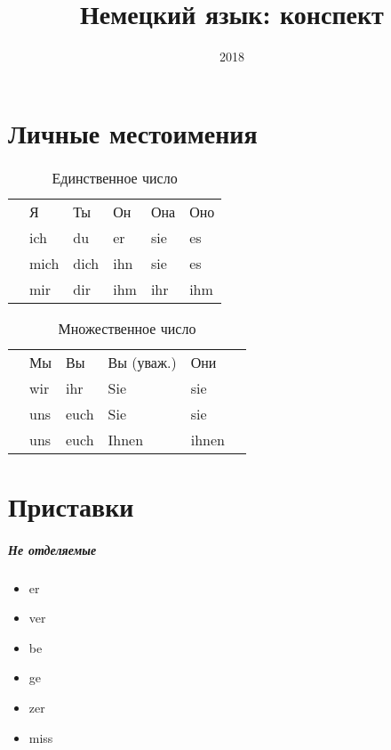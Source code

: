 \documentclass[12pt,a4paper]{report}
\title{Немецкий язык: конспект}
\date{2018}
\newcommand{\nom}{ {\color{black}{\textbf{N}}} }
\newcommand{\akk}{ {\color{red}{\textbf{A}}} }
\newcommand{\dat}{ {\color{blue}{\textbf{D}}} }
\begin{document}
\tableofcontents

\chapter{Личные местоимения}

\begin{longtable}{ c l l l l l }
\caption{Единственное число} \label{tab:long}\\
		& Я 	& Ты 	& Он  	& Она	& Оно	\\
\nom 	& ich 	& du	& er	& sie	& es	\\
\akk 	& mich 	& dich	& ihn	& sie	& es	\\
\dat 	& mir 	& dir	& ihm	& ihr	& ihm	\\
\end{longtable}

\begin{longtable}{ c l l l l l }
\caption{Множественное число} \label{tab:long}\\
		& Мы 	& Вы 	& Вы (уваж.)	& Они	\\
\nom 	& wir 	& ihr	& Sie			& sie	\\
\akk 	& uns 	& euch	& Sie			& sie	\\
\dat 	& uns 	& euch	& Ihnen			& ihnen	\\
\end{longtable}

\chapter{Приставки}

\paragraph{Не отделяемые}
\begin{itemize}
 \item er
 \item ver
 \item be
 \item ge
 \item zer
 \item miss
\end{itemize}

\end{document}
